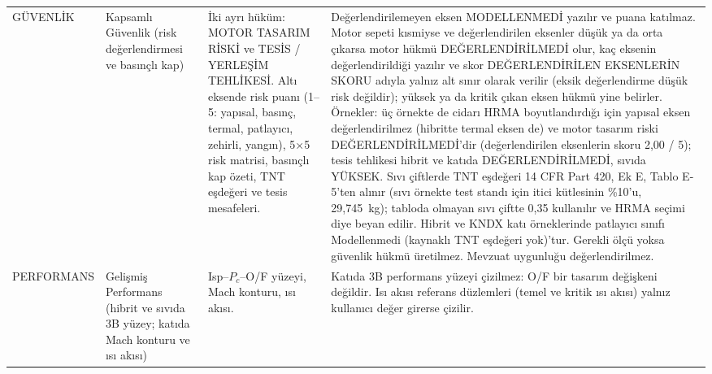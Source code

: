 \documentclass[11pt,a4paper]{article}
\newcommand{\ui}[1]{\textsf{#1}}
\begin{document}
\begin{longtable}{@{}>{\raggedright\arraybackslash}p{3.2cm}>{\raggedright\arraybackslash}p{3.6cm}>{\raggedright\arraybackslash}p{4.2cm}>{\raggedright\arraybackslash}p{4.6cm}@{}}
\ui{GÜVENLİK} & Kapsamlı Güvenlik (risk değerlendirmesi ve basınçlı kap) & İki ayrı hüküm: \ui{MOTOR TASARIM RİSKİ} ve \ui{TESİS / YERLEŞİM TEHLİKESİ}. Altı eksende risk puanı (1--5: yapısal, basınç, termal, patlayıcı, zehirli, yangın), 5×5 risk matrisi, basınçlı kap özeti, TNT eşdeğeri ve tesis mesafeleri. & Değerlendirilemeyen eksen \ui{MODELLENMEDİ} yazılır ve puana katılmaz. Motor sepeti kısmiyse ve değerlendirilen eksenler düşük ya da orta çıkarsa motor hükmü \ui{DEĞERLENDİRİLMEDİ} olur, kaç eksenin değerlendirildiği yazılır ve skor \ui{DEĞERLENDİRİLEN EKSENLERİN SKORU} adıyla yalnız alt sınır olarak verilir (eksik değerlendirme düşük risk değildir); yüksek ya da kritik çıkan eksen hükmü yine belirler. Örnekler: üç örnekte de cidarı HRMA boyutlandırdığı için yapısal eksen değerlendirilmez (hibritte termal eksen de) ve motor tasarım riski \ui{DEĞERLENDİRİLMEDİ}'dir (değerlendirilen eksenlerin skoru 2,00 / 5); tesis tehlikesi hibrit ve katıda \ui{DEĞERLENDİRİLMEDİ}, sıvıda \ui{YÜKSEK}. Sıvı çiftlerde TNT eşdeğeri 14 CFR Part 420, Ek E, Tablo E-5'ten alınır (sıvı örnekte test standı için itici kütlesinin \%10'u, 29,745~kg); tabloda olmayan sıvı çiftte 0,35 kullanılır ve HRMA seçimi diye beyan edilir. Hibrit ve KNDX katı örneklerinde patlayıcı sınıfı \ui{Modellenmedi (kaynaklı TNT eşdeğeri yok)}'tur. Gerekli ölçü yoksa güvenlik hükmü üretilmez. Mevzuat uygunluğu değerlendirilmez. \\
\ui{PERFORMANS} & Gelişmiş Performans (hibrit ve sıvıda 3B yüzey; katıda Mach konturu ve ısı akısı) & Isp--$P_c$--O/F yüzeyi, Mach konturu, ısı akısı. & Katıda 3B performans yüzeyi çizilmez: O/F bir tasarım değişkeni değildir. Isı akısı referans düzlemleri (temel ve kritik ısı akısı) yalnız kullanıcı değer girerse çizilir. \\

\end{longtable}
\end{document}
